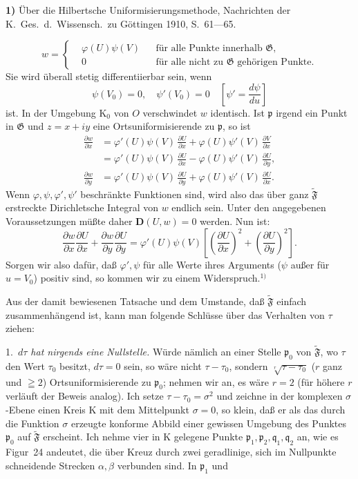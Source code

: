 \documentclass{article}
\begin{document}
\textbf{1)} Über die Hilbertsche Uniformisierungsmethode, Nachrichten der K.~Ges.\ d.~Wissensch.\ zu Göttingen 1910, S.~61---65.

\[ w = \left\{ \begin{aligned} &\varphi(U)\psi(V) &&\text{für alle Punkte innerhalb } \mathfrak{G}, \\ &0 &&\text{für alle nicht zu } \mathfrak{G} \text{ gehörigen Punkte.} \end{aligned} \right. \]
Sie wird überall stetig differentiierbar sein, wenn
\[ \psi(V_0) = 0, \quad \psi'(V_0) = 0 \quad \left[ \psi' = \frac{d\psi}{du} \right] \]
ist. In der Umgebung $\mathrm{K}_0$ von $O$ verschwindet $w$ identisch. Ist $\mathfrak{p}$ irgend ein Punkt in $\mathfrak{G}$ und $z = x + iy$ eine Ortsuniformisierende zu $\mathfrak{p}$, so ist
\[ \begin{aligned} \frac{\partial w}{\partial x} &= \varphi'(U)\psi(V)\,\frac{\partial U}{\partial x} + \varphi(U)\psi'(V)\,\frac{\partial V}{\partial x} \\ &= \varphi'(U)\psi(V)\,\frac{\partial U}{\partial x} - \varphi(U)\psi'(V)\,\frac{\partial U}{\partial y}, \\ \frac{\partial w}{\partial y} &= \varphi'(U)\psi(V)\,\frac{\partial U}{\partial y} + \varphi(U)\psi'(V)\,\frac{\partial U}{\partial x}. \end{aligned} \]
Wenn $\varphi, \psi, \varphi', \psi'$ beschränkte Funktionen sind, wird also das über ganz $\widetilde{\mathfrak{F}}$ erstreckte Dirichletsche Integral von $w$ endlich sein. Unter den angegebenen Voraussetzungen müßte daher $\mathbf{D}(U, w) = 0$ werden. Nun ist:
\[ \frac{\partial w}{\partial x} \frac{\partial U}{\partial x} + \frac{\partial w}{\partial y} \frac{\partial U}{\partial y} = \varphi'(U)\psi(V)\left[ \left(\frac{\partial U}{\partial x}\right)^2 + \left(\frac{\partial U}{\partial y}\right)^2 \right]. \]
Sorgen wir also dafür, daß $\varphi', \psi$ für alle Werte ihres Arguments ($\psi$ außer für $u = V_0$) positiv sind, so kommen wir zu einem Widerspruch.${}^{1)}$

Aus der damit bewiesenen Tatsache und dem Umstande, daß $\widetilde{\mathfrak{F}}$ einfach zusammenhängend ist, kann man folgende Schlüsse über das Verhalten von $\tau$ ziehen:

1.\ \emph{$d\tau$ hat nirgends eine Nullstelle.} Würde nämlich an einer Stelle $\mathfrak{p}_0$ von $\widetilde{\mathfrak{F}}$, wo $\tau$ den Wert $\tau_0$ besitzt, $d\tau = 0$ sein, so wäre nicht $\tau - \tau_0$, sondern $\sqrt[r]{\tau - \tau_0}$ ($r$ ganz und $\geqq 2$) Ortsuniformisierende zu $\mathfrak{p}_0$; nehmen wir an, es wäre $r = 2$ (für höhere $r$ verläuft der Beweis analog). Ich setze $\tau - \tau_0 = \sigma^2$ und zeichne in der komplexen $\sigma$-Ebene einen Kreis $\mathrm{K}$ mit dem Mittelpunkt $\sigma = 0$, so klein, daß er als das durch die Funktion $\sigma$ erzeugte konforme Abbild einer gewissen Umgebung des Punktes $\mathfrak{p}_0$ auf $\widetilde{\mathfrak{F}}$ erscheint. Ich nehme vier in $\mathrm{K}$ gelegene Punkte $\mathfrak{p}_1, \mathfrak{p}_2, \mathfrak{q}_1, \mathfrak{q}_2$ an, wie es Figur~24 andeutet, die über Kreuz durch zwei geradlinige, sich im Nullpunkte schneidende Strecken $\alpha, \beta$ verbunden sind. In $\mathfrak{p}_1$ und
\end{document}
